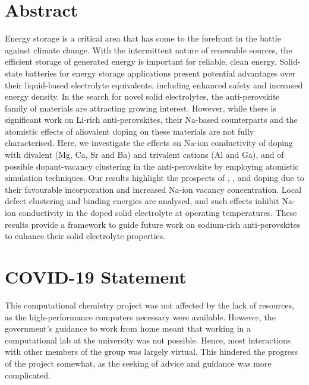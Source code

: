 \documentclass[12pt]{report}
\begin{document}

\clearpage

\tableofcontents
\thispagestyle{empty}
\clearpage





\chapter*{Abstract}

Energy storage is a critical area that has come to the forefront in the battle against climate change.
With the intermittent nature of renewable sources, the efficient storage of generated energy is important for reliable, clean energy.
Solid-state batteries for energy storage applications present potential advantages over their liquid-based electrolyte equivalents, including enhanced safety and increased energy density. 
In the search for novel solid electrolytes, the anti-perovskite family of materials are attracting growing interest. 
However, while there is significant work on Li-rich anti-perovskites, their Na-based counterparts and the atomistic effects of aliovalent doping on these materials are not fully characterised. 
Here, we investigate the effects on Na-ion conductivity of doping with divalent (Mg, Ca, Sr and Ba) and trivalent cations (Al and Ga), and of possible dopant-vacancy clustering in the anti-perovskite  by employing atomistic simulation techniques.
Our results highlight the prospects of , ,  and  doping due to their favourable incorporation and increased Na-ion vacancy concentration. 
Local defect clustering and binding energies are analysed, and such effects inhibit Na-ion conductivity in the doped  solid electrolyte at operating temperatures. 
These results provide a framework to guide future work on sodium-rich anti-perovskites to enhance their solid electrolyte properties.

\clearpage





\chapter*{COVID-19 Statement}

This computational chemistry project was not affected by the lack of resources, as the high-performance computers necessary were available.
However, the government's guidance to work from home meant that working in a computational lab at the university was not possible.
Hence, most interactions with other members of the group was largely virtual.
This hindered the progress of the project somewhat, as the seeking of advice and guidance was more complicated.
\end{document}
